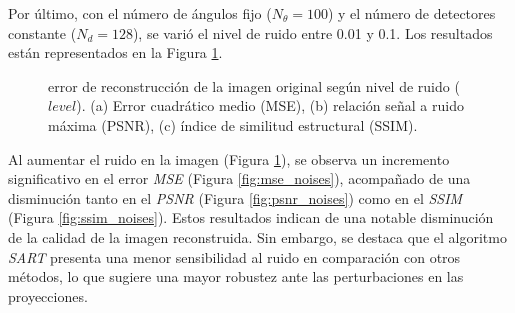\documentclass[11pt, twocolumn]{article}
\begin{document}
Por último, con el número de ángulos fijo ($N_\theta = 100$) y el número de detectores constante ($N_d = 128$), se varió el nivel de ruido entre 0.01 y 0.1. Los resultados están representados en la Figura \ref{fig:ej_2_noises}.

\begin{figure}[htbp]
  \centering
  \hfill
  \hfill
  \hfill
  \caption{error de reconstrucción de la imagen original según nivel de ruido ($level$). (a) Error cuadrático medio (MSE), (b) relación señal a ruido máxima (PSNR), (c) índice de similitud estructural (SSIM).}
  \label{fig:ej_2_noises}
\end{figure}

Al aumentar el ruido en la imagen (Figura \ref{fig:ej_2_noises}), se observa un incremento significativo en el error \textit{MSE} (Figura \ref{fig:mse_noises}), acompañado de una disminución tanto en el \textit{PSNR} (Figura \ref{fig:psnr_noises}) como en el \textit{SSIM} (Figura \ref{fig:ssim_noises}). Estos resultados indican de una notable disminución de la calidad de la imagen reconstruida. Sin embargo, se destaca que el algoritmo \textit{SART} presenta una menor sensibilidad al ruido en comparación con otros métodos, lo que sugiere una mayor robustez ante las perturbaciones en las proyecciones.
\end{document}
